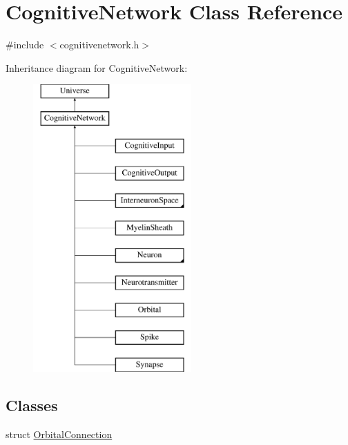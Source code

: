 \hypertarget{classCognitiveNetwork}{}\section{Cognitive\+Network Class Reference}
\label{classCognitiveNetwork}


{\ttfamily \#include $<$cognitivenetwork.\+h$>$}

Inheritance diagram for Cognitive\+Network\+:\begin{figure}[H]
\begin{center}
\leavevmode
\includegraphics[height=11.000000cm]{classCognitiveNetwork}
\end{center}
\end{figure}
\subsection*{Classes}
\begin{DoxyCompactItemize}
\item 
struct \mbox{\hyperlink{structCognitiveNetwork_1_1OrbitalConnection}{Orbital\+Connection}}
\end{DoxyCompactItemize}

